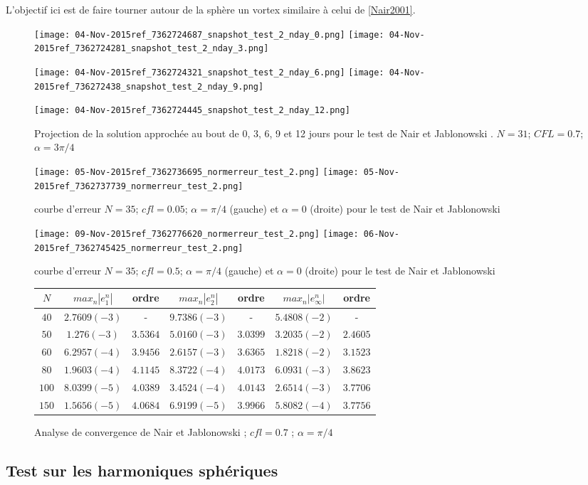 L'objectif ici est de faire tourner autour de la sphère un vortex similaire à celui de \ref{Nair2001}.


\begin{figure}[H]
\texttt{[image: 04-Nov-2015ref\_7362724687\_snapshot\_test\_2\_nday\_0.png]}
\texttt{[image: 04-Nov-2015ref\_7362724281\_snapshot\_test\_2\_nday\_3.png]}

\texttt{[image: 04-Nov-2015ref\_7362724321\_snapshot\_test\_2\_nday\_6.png]}
\texttt{[image: 04-Nov-2015ref\_736272438\_snapshot\_test\_2\_nday\_9.png]}

\texttt{[image: 04-Nov-2015ref\_7362724445\_snapshot\_test\_2\_nday\_12.png]}
\caption{Projection de la solution approchée au bout de 0, 3, 6, 9 et 12 jours pour le test de Nair et Jablonowski \cite{Nair2008}. $N=31$; $CFL = 0.7$; $\alpha = 3 \pi / 4$}
\label{SNAPSHOT}
\end{figure}



\begin{figure}[H]
\texttt{[image: 05-Nov-2015ref\_7362736695\_normerreur\_test\_2.png]}
\texttt{[image: 05-Nov-2015ref\_7362737739\_normerreur\_test\_2.png]}
\label{erreur_cfl=0.05}
\caption{courbe d'erreur $N=35$; $cfl=0.05$; $\alpha = \pi / 4$ (gauche) et $\alpha = 0$ (droite) pour le test de Nair et Jablonowski \cite{Nair2008}}
\end{figure}



\begin{figure}[H]
\texttt{[image: 09-Nov-2015ref\_7362776620\_normerreur\_test\_2.png]}
\texttt{[image: 06-Nov-2015ref\_7362745425\_normerreur\_test\_2.png]}
\label{erreur_cfl=0.5}
\caption{courbe d'erreur $N=35$; $cfl=0.5$; $\alpha = \pi / 4$ (gauche) et $\alpha = 0$ (droite) pour le test de Nair et Jablonowski \cite{Nair2008}}
\end{figure}



\begin{figure}
\begin{tabular}{c||cc|cc|cc}
$N$ & $max_n |e_1^n|$ & ordre  & $max_n |e_2^n|$ & ordre  & $max_n |e_{\infty}^n|$ & ordre \\
\hline
\hline
$40$ & $2.7609 (-3)$ & -  & $9.7386 (-3)$ & - & $5.4808 (-2)$  & - \\
\hline 
$50$ & $1.276 (-3)$ & $3.5364$ & $5.0160 (-3)$ & $3.0399$ & $3.2035 (-2)$ & $2.4605$ \\
\hline
$60$ & $6.2957 (-4)$ & $3.9456$ & $2.6157 (-3)$ & $3.6365$ & $1.8218 (-2)$ & $3.1523$ \\
\hline
$80$ & $1.9603 (-4) $ & $4.1145$ & $8.3722 (-4)$ & $4.0173$ & $6.0931 (-3)$ & $3.8623$ \\
\hline
$100$ & $8.0399 (-5)$ & $4.0389$ & $3.4524 (-4)$ & $4.0143$ & $2.6514 (-3)$ & $3.7706$\\
\hline
$150$ & $1.5656 (-5)$ & $4.0684$ & $6.9199 (-5)$ & $3.9966$ & $5.8082 (-4)$ & $3.7756$
\end{tabular}
\caption{Analyse de convergence de Nair et Jablonowski \cite{Nair2008} ; $cfl = 0.7$ ; $\alpha = \pi /4$}
\end{figure}


\subsection{Test sur les harmoniques sphériques}
